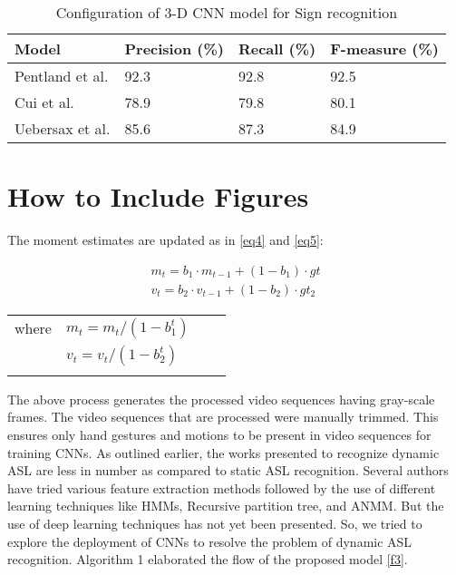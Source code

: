 \documentclass[
  manuscript=article,  %
  layout=preprint,  %
  year=20xx,
  volume=x,
]{extra/ledger}
\begin{document}
\begin{table}[!ht]
\caption{ Configuration of 3-D CNN model for Sign recognition\label{tab1}}
\begin{tabular*}{\columnwidth}{@{\extracolsep\fill}llll@{\extracolsep\fill}}
\toprule
Model & Precision (\%) & Recall (\%) & F-measure (\%)\\
\midrule
Pentland et al. & 92.3 & 92.8 & 92.5\\
Cui et al. & 78.9 & 79.8 & 80.1 \\
Uebersax et al. & 85.6 &87.3 & 84.9 \\
\bottomrule
\end{tabular*}
\end{table}






\section{How to Include Figures}\label{sec6}

The moment estimates are updated as in \ref{eq4} and \ref{eq5}:


\begin{minipage}[h]{1\textwidth}
\begin{align}
m_{t}=b_{1} \cdot m_{t-1}+(1-b_{1}) \cdot gt\label{eq4} \\ 
v_{t}=b_{2} \cdot v_{t-1}+(1-b_{2}) \cdot gt_{2} \label{eq5}
\end{align}
\begin{tabular}{llll}
    where & $m_{t} = m_{t}/ (1-b^t_{1}) $ \\
    \addlinespace
    & $v_{t} = v_{t}/ (1-b^t_{2}) $ \\
    \addlinespace
\end{tabular}
\end{minipage}

The above process generates the processed video sequences having gray-scale frames. The video sequences that are processed were manually trimmed. This ensures only hand gestures and motions to be present in video sequences for training CNNs. As outlined earlier, the works presented to recognize dynamic ASL are less in number as compared to static ASL recognition. Several authors have tried various feature extraction methods followed by the use of different learning techniques like HMMs, Recursive partition tree, and ANMM. But the use of deep learning techniques has not yet been presented. So, we tried to explore the deployment of CNNs to resolve the problem of dynamic ASL recognition. Algorithm 1 elaborated the flow of the proposed model \ref{f3}.
\end{document}
